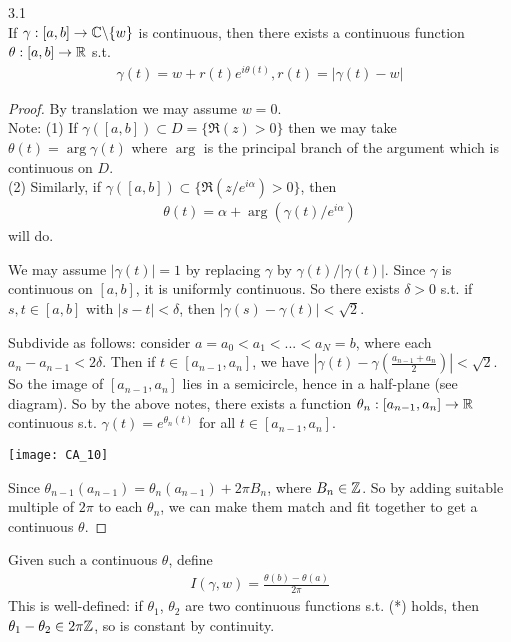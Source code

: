 \documentclass[a4paper]{article}
\begin{document}
\begin{thm} 3.1\\
If $\gamma: [a,b] \to \mathbb{C} \backslash \{w\}$ is continuous, then there exists a continuous function $\theta:[a,b] \to \mathbb{R}$ s.t.
\begin{equation*} \tag{*}
\begin{aligned}
\gamma(t) = w+r(t)e^{i\theta(t)}, r(t) = |\gamma(t)-w|
\end{aligned}
\end{equation*}
\begin{proof}
By translation we may assume $w=0$.\\
Note: (1) If $\gamma([a,b]) \subset D=\{\Re(z)>0\}$ then we may take $\theta(t) = \arg \gamma(t)$ where $\arg$ is the principal branch of the argument which is continuous on $D$.\\
(2) Similarly, if $\gamma([a,b]) \subset \{\Re(z/e^{i\alpha}) > 0\}$, then
\begin{equation*}
\begin{aligned}
\theta(t) = \alpha + \arg(\gamma(t)/e^{i\alpha})
\end{aligned}
\end{equation*}
will do.

We may assume $|\gamma(t)|=1$ by replacing $\gamma$ by $\gamma(t) / |\gamma(t)|$. Since $\gamma$ is continuous on $[a,b]$, it is uniformly continuous. So there exists $\delta > 0$ s.t. if $s,t \in [a,b]$ with $|s-t|<\delta$, then $|\gamma(s) - \gamma(t)| < \sqrt{2}$.

Subdivide as follows: consider $a=a_0<a_1<...<a_N = b$, where each $a_n-a_{n-1} < 2\delta$. Then if $t \in [a_{n-1},a_n]$, we have $\left|\gamma(t) - \gamma\left(\frac{a_{n-1}+a_n}{2}\right)\right| < \sqrt{2}$. So the image of $[a_{n-1},a_n]$ lies in a semicircle, hence in a half-plane (see diagram). So by the above notes, there exists a function $\theta_n:[a_{n-1},a_n] \to \mathbb{R}$ continuous s.t. $\gamma(t) = e^{\theta_n(t)}$ for all $t \in [a_{n-1},a_n]$.

\texttt{[image: CA\_10]}

Since $\theta_{n-1} (a_{n-1}) = \theta_n (a_{n-1}) + 2\pi B_n$, where $B_n \in \mathbb{Z}$. So by adding suitable multiple of $2\pi$ to each $\theta_n$, we can make them match and fit together to get a continuous $\theta$.
\end{proof}
\end{thm}

Given such a continuous $\theta$, define 
\begin{equation*}
\begin{aligned}
I(\gamma,w) = \frac{\theta(b)-\theta(a)}{2\pi}
\end{aligned}
\end{equation*}
This is well-defined: if $\theta_1$, $\theta_2$ are two continuous functions s.t. (*) holds, then $\theta_1-\theta_2 \in 2\pi \mathbb{Z}$, so is constant by continuity.
\end{document}
